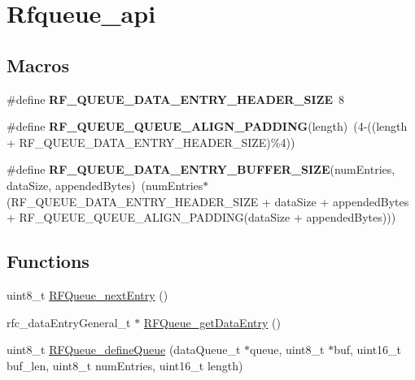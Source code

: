 \hypertarget{group__rfqueue__api}{}\section{Rfqueue\+\_\+api}
\label{group__rfqueue__api}
\subsection*{Macros}
\begin{DoxyCompactItemize}
\item 
\mbox{\label{group__rfqueue__api_gab64fb151edb6f253caa7a2dd06c8aaed}} 
\#define {\bfseries R\+F\+\_\+\+Q\+U\+E\+U\+E\+\_\+\+D\+A\+T\+A\+\_\+\+E\+N\+T\+R\+Y\+\_\+\+H\+E\+A\+D\+E\+R\+\_\+\+S\+I\+ZE}~8
\item 
\mbox{\label{group__rfqueue__api_gaf530d7cb605904b7e02f781f9f72b4c5}} 
\#define {\bfseries R\+F\+\_\+\+Q\+U\+E\+U\+E\+\_\+\+Q\+U\+E\+U\+E\+\_\+\+A\+L\+I\+G\+N\+\_\+\+P\+A\+D\+D\+I\+NG}(length)~(4-\/((length + R\+F\+\_\+\+Q\+U\+E\+U\+E\+\_\+\+D\+A\+T\+A\+\_\+\+E\+N\+T\+R\+Y\+\_\+\+H\+E\+A\+D\+E\+R\+\_\+\+S\+I\+ZE)\%4))
\item 
\mbox{\label{group__rfqueue__api_gaf3448a93c80327e00df1789bdf031f6a}} 
\#define {\bfseries R\+F\+\_\+\+Q\+U\+E\+U\+E\+\_\+\+D\+A\+T\+A\+\_\+\+E\+N\+T\+R\+Y\+\_\+\+B\+U\+F\+F\+E\+R\+\_\+\+S\+I\+ZE}(num\+Entries,  data\+Size,  appended\+Bytes)~(num\+Entries$\ast$(R\+F\+\_\+\+Q\+U\+E\+U\+E\+\_\+\+D\+A\+T\+A\+\_\+\+E\+N\+T\+R\+Y\+\_\+\+H\+E\+A\+D\+E\+R\+\_\+\+S\+I\+ZE + data\+Size + appended\+Bytes + R\+F\+\_\+\+Q\+U\+E\+U\+E\+\_\+\+Q\+U\+E\+U\+E\+\_\+\+A\+L\+I\+G\+N\+\_\+\+P\+A\+D\+D\+I\+NG(data\+Size + appended\+Bytes)))
\end{DoxyCompactItemize}
\subsection*{Functions}
\begin{DoxyCompactItemize}
\item 
uint8\+\_\+t \mbox{\hyperlink{group__rfqueue__api_gad4ae4cf528d203b97d3b7deab662d533}{R\+F\+Queue\+\_\+next\+Entry}} ()
\item 
rfc\+\_\+data\+Entry\+General\+\_\+t $\ast$ \mbox{\hyperlink{group__rfqueue__api_ga460322048ee0ed478543374ca1b44f69}{R\+F\+Queue\+\_\+get\+Data\+Entry}} ()
\item 
uint8\+\_\+t \mbox{\hyperlink{group__rfqueue__api_gac6669024f260e67af2c1bb2d65887b97}{R\+F\+Queue\+\_\+define\+Queue}} (data\+Queue\+\_\+t $\ast$queue, uint8\+\_\+t $\ast$buf, uint16\+\_\+t buf\+\_\+len, uint8\+\_\+t num\+Entries, uint16\+\_\+t length)
\end{DoxyCompactItemize}


